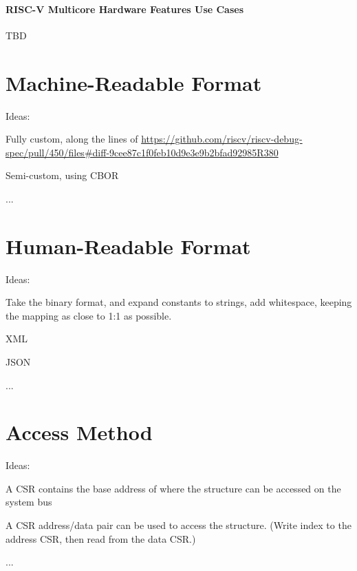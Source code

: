 \subsubsection{RISC-V Multicore Hardware Features Use Cases}

TBD

\chapter{Machine-Readable Format}

\begin{steps}{Ideas:}
\item Fully custom, along the lines of
    \url{https://github.com/riscv/riscv-debug-spec/pull/450/files#diff-9cee87c1f0feb10d9e3e9b2bfad92985R380}
\item Semi-custom, using CBOR
\item ...
\end{steps}

\chapter{Human-Readable Format}

\begin{steps}{Ideas:}
\item Take the binary format, and expand constants to strings, add whitespace,
keeping the mapping as close to 1:1 as possible.
\item XML
\item JSON
\item ...
\end{steps}

\chapter{Access Method}
\label{sec:AccessMethod}

\begin{steps}{Ideas:}
\item A CSR contains the base address of where the structure can be accessed on
the system bus
\item A CSR address/data pair can be used to access the structure. (Write index
to the address CSR, then read from the data CSR.)
\item ...
\end{steps}
